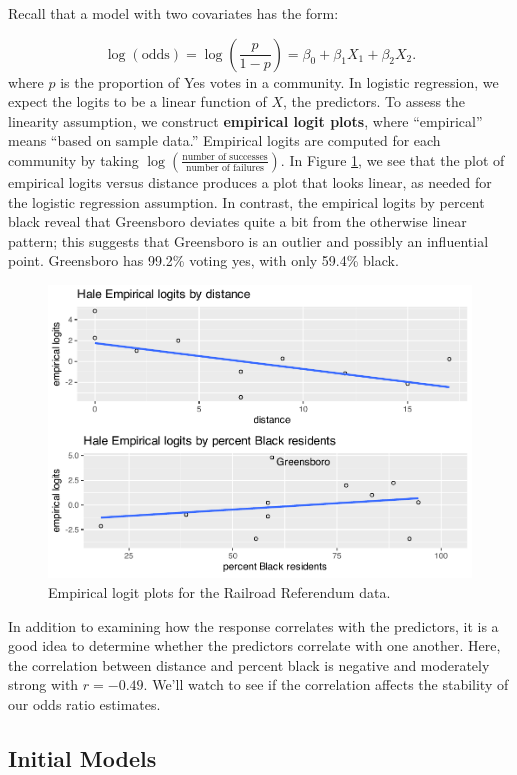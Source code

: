 \documentclass[
]{krantz}
\begin{document}
Recall that a model with two covariates has the form:

\[\log(\textrm{odds}) = \log\left(\frac{p}{1-p}\right) = \beta_0+\beta_1X_1+\beta_2X_2.\]
where \(p\) is the proportion of Yes votes in a community. In logistic regression, we expect the logits to be a linear function of \(X\), the predictors. To assess the linearity assumption, we construct \textbf{empirical logit plots},  where ``empirical'' means ``based on sample data.'' Empirical logits are computed for each community by taking \(\log\left(\frac{\textrm{number of successes}}{\textrm{number of failures}}\right)\). In Figure \ref{fig:emplogits}, we see that the plot of empirical logits versus distance produces a plot that looks linear, as needed for the logistic regression assumption. In contrast, the empirical logits by percent black reveal that Greensboro deviates quite a bit from the otherwise linear pattern; this suggests that Greensboro is an outlier and possibly an influential point. Greensboro has 99.2\% voting yes, with only 59.4\% black.

\begin{figure}

{\centering \includegraphics[width=0.6\linewidth]{bookdown-BeyondMLR_files/figure-latex/emplogits-1} 

}

\caption{Empirical logit plots for the Railroad Referendum data.}\label{fig:emplogits}
\end{figure}

In addition to examining how the response correlates with the predictors, it is a good idea to determine whether the predictors correlate with one another. Here, the correlation between distance and percent black is negative and moderately strong with \(r = -0.49\). We'll watch to see if the correlation affects the stability of our odds ratio estimates.

\hypertarget{initial-models-1}{%
\subsection{Initial Models}\label{initial-models-1}}
\end{document}
